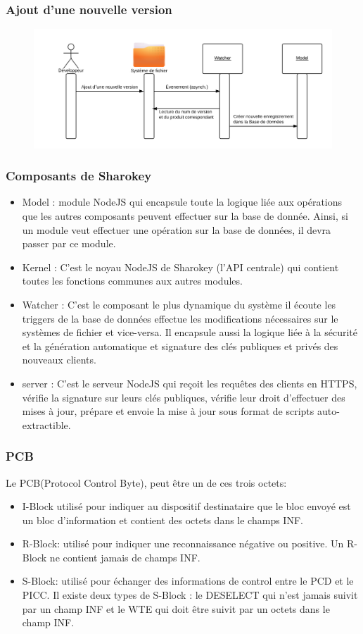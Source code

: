 \documentclass{beamer}
\begin{document}
\begin{frame}
\frametitle{Ajout d'une nouvelle version}
\begin{figure}
\centering
\includegraphics[scale=0.6]{images/3.png}
\end{figure}
\end{frame}
\begin{frame}
\frametitle{Composants de Sharokey}
\begin{itemize}
\item Model : module NodeJS qui encapsule toute la logique liée aux opérations que les autres
composants peuvent effectuer sur la base de donnée. Ainsi, si un module veut effectuer
une opération sur la base de données, il devra passer par ce module.
\item Kernel : C’est le noyau NodeJS de Sharokey (l’API centrale) qui contient toutes les
fonctions communes aux autres modules.
\item Watcher : C’est le composant le plus dynamique du système il écoute les triggers de la base
de données effectue les modifications nécessaires sur le systèmes de fichier et vice-versa.
Il encapsule aussi la logique liée à la sécurité et la génération automatique et signature
des clés publiques et privés des nouveaux clients.
\item server : C’est le serveur NodeJS qui reçoit les requêtes des clients en HTTPS, vérifie la
signature sur leurs clés publiques, vérifie leur droit d’effectuer des mises à jour, prépare
et envoie la mise à jour sous format de scripts auto-extractible.

\end{itemize}
\end{frame}
\begin{frame}
\frametitle{PCB}
Le PCB(Protocol Control Byte), peut être un de ces trois octets:
\begin{itemize}
\item I-Block utilisé pour indiquer au dispositif destinataire que le bloc envoyé est
un bloc d’information et contient des octets dans le champs INF.
\item R-Block: utilisé pour indiquer une reconnaissance négative ou positive. Un R-
Block ne contient jamais de champs INF.
\item S-Block: utilisé pour échanger des informations de control entre le PCD et le
PICC. Il existe deux types de S-Block : le DESELECT qui n’est jamais suivit par un
champ INF et le WTE qui doit être suivit par un octets dans le champ INF.
\end{itemize}
\end{frame}
\end{document}
